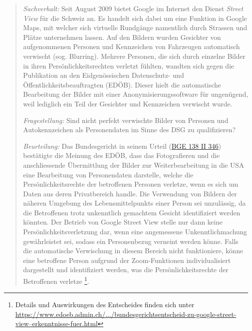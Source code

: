\documentclass[a4paper,pointlessnumbers]{scrreprt}
\begin{document}
\begin{quote}
\textit{Sachverhalt:} Seit August 2009 bietet Google im Internet den Dienst \textit{Street View} für die Schweiz an. Es handelt sich dabei um eine Funktion in Google Maps, mit welcher sich virtuelle Rundgänge namentlich durch Strassen und Plätze unternehmen lassen. Auf den Bildern wurden Gesichter von aufgenommenen Personen und Kennzeichen von Fahrzeugen automatisch verwischt (sog. Blurring). Mehrere Personen, die sich durch einzelne Bilder in ihren Persönlichkeitsrechten verletzt fühlten, wandten sich gegen die Publikation an den Eidgenössischen Datenschutz- und Öffentlichkeitsbeauftragten (EDÖB). Dieser hielt die automatische Bearbeitung der Bilder mit einer Anonymisierungssoftware für ungenügend, weil lediglich ein Teil der Gesichter und Kennzeichen verwischt wurde.

\textit{Fragestellung:} Sind nicht perfekt verwischte Bilder von Personen und Autokennzeichen als Personendaten im Sinne des DSG zu qualifizieren?

\textit{Beurteilung:} Das Bundesgericht in seinem Urteil (\href{http://relevancy.bger.ch/php/clir/http/index.php?highlight_docid=atf\%3A\%2F\%2F138-II-346\%3Ade&lang=de&type=show\_document}{BGE 138 II 346}) bestätigte die Meinung des EDÖB, dass das Fotografieren und die anschliessende Übermittlung der Bilder zur Weiterbearbeitung in die USA eine Bearbeitung von Personendaten darstelle, welche die Persönlichkeitsrechte der betroffenen Personen verletze, wenn es sich um Daten aus deren Privatbereich handle. Die Verwendung von Bildern der näheren Umgebung des Lebensmittelpunkts einer Person sei unzulässig, da die Betroffenen trotz unkenntlich gemachtem Gesicht identifiziert werden könnten. Der Betrieb von Google Street View stelle nur dann keine Persönlichkeitsverletzung dar, wenn eine angemessene Unkenntlichmachung gewährleistet sei, sodass ein Personenbezug verneint werden könne. Falls die automatische Verwischung in diesem Bereich nicht funktioniere, könne eine betroffene Person aufgrund der Zoom-Funktionen individualisiert dargestellt und identifiziert werden, was die Persönlichkeitsrechte der Betroffenen verletze \footnote{Details und Auswirkungen des Entscheides finden sich unter \href{https://www.edoeb.admin.ch/edoeb/de/home/datenschutz/Internet\_und\_Computer/onlinedienste/google-street-view/bundesgerichtsentscheid-zu-google-street-view--erkenntnisse-fuer.html}{https://www.edoeb.admin.ch/.../bundesgerichtsentscheid-zu-google-street-view--erkenntnisse-fuer.html}}.
\end{quote}
\end{document}
